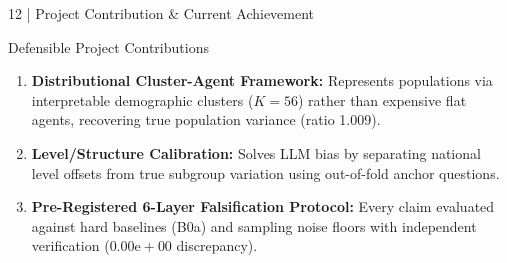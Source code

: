 \documentclass[10pt,aspectratio=169]{beamer}
\begin{document}
\begin{frame}{12 | Project Contribution \& Current Achievement}
    \scriptsize
    \begin{block}{Defensible Project Contributions}
        \tiny
        \begin{enumerate}\itemsep3pt
            \item \textbf{Distributional Cluster-Agent Framework:} Represents populations via interpretable demographic clusters ($K=56$) rather than expensive flat agents, recovering true population variance (ratio 1.009).
            \item \textbf{Level/Structure Calibration:} Solves LLM bias by separating national level offsets from true subgroup variation using out-of-fold anchor questions.
            \item \textbf{Pre-Registered 6-Layer Falsification Protocol:} Every claim evaluated against hard baselines (B0a) and sampling noise floors with independent verification ($0.00\mathrm{e}{+}00$ discrepancy).
        \end{enumerate}
    \end{block}


\end{frame}
\end{document}
